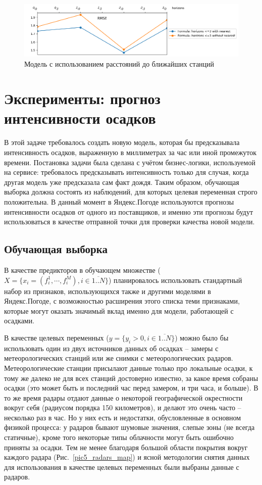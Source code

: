 \documentclass[14pt]{matmex-diploma}
\begin{document}
\begin{figure}
\centering
\includegraphics[width=\linewidth]{images/pic3_metrics_final.png}
\caption{Модель с использованием расстояний до ближайших станций}
\label{pic3_metrics_final}
\end{figure}


\section{Эксперименты: прогноз интенсивности осадков}

В этой задаче требовалось создать новую модель, которая бы предсказывала интенсивность осадков, выраженную в миллиметрах за час или иной промежуток времени. Постановка задачи была сделана с учётом бизнес-логики, используемой на сервисе: требовалось предсказывать интенсивность только для случая, когда другая модель уже предсказала сам факт дождя. Таким образом, обучающая выборка должна состоять из наблюдений, для которых целевая переменная строго положительна. В данный момент в Яндекс.Погоде используются прогнозы интенсивности осадков от одного из поставщиков, и именно эти прогнозы будут использоваться в качестве отправной точки для проверки качества новой модели.

\subsection{Обучающая выборка}

В качестве предикторов в обучающем множестве ($X = \{x_i = (f^1_{i}, \cdots, f^M_i), i \in \overline{1..N}\}$) планировалось использовать стандартный набор из признаков, использующихся также и другими моделями в Яндекс.Погоде, с возможностью расширения этого списка теми признаками, которые могут оказать значимый вклад именно для модели, работающей с осадками.

В качестве целевых переменных ($y = \{y_i > 0, i \in \overline{1..N}\}$) можно было бы использовать один из двух источников данных об осадках -- замеры с метеорологических станций или же снимки с метеорологических радаров. Метеорологические станции присылают данные только про локальные осадки, к тому же далеко не для всех станций достоверно известно, за какое время собраны осадки (это может быть и последний час перед замером, и три часа, и больше). В то же время радары отдают данные о некоторой географической окрестности вокруг себя (радиусом порядка 150 километров), и делают это очень часто -- несколько раз в час. Но у них есть и недостатки, обусловленные в основном физикой процесса: у радаров бывают шумовые значения, слепые зоны (не всегда статичные), кроме того некоторые типы облачности могут быть ошибочно приняты за осадки. Тем не менее благодаря большой области покрытия вокруг каждого радара (Рис.~\ref{pic5_radars_map}) и ясной методологии снятия данных для использования в качестве целевых переменных были выбраны данные с радаров.
\end{document}
